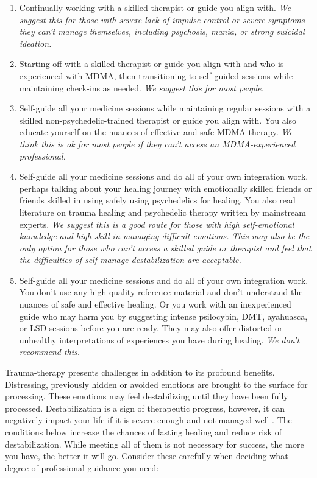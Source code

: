 \documentclass[12pt,letterpaper]{article}
\begin{document}
\begin{enumerate}
    \item Continually working with a skilled therapist or guide you align with. \textit{We suggest this for those with severe lack of impulse control or severe symptoms they can't manage themselves, including psychosis, mania, or strong suicidal ideation.}
    \item Starting off with a skilled therapist or guide you align with and who is experienced with MDMA, then transitioning to self-guided sessions while maintaining check-ins as needed. \textit{We suggest this for most people.}
    \item Self-guide all your medicine sessions while maintaining regular sessions with a skilled non-psychedelic-trained therapist or guide you align with. You also educate yourself on the nuances of effective and safe MDMA therapy. \textit{We think this is ok for most people if they can't access an MDMA-experienced professional.}
    \item Self-guide all your medicine sessions and do all of your own integration work, perhaps talking about your healing journey with emotionally skilled friends or friends skilled in using safely using psychedelics for healing. You also read literature on trauma healing and psychedelic therapy written by mainstream experts. \textit{We suggest this is a good route for those with high self-emotional knowledge and high skill in managing difficult emotions. This may also be the only option for those who can't access a skilled guide or therapist and feel that the difficulties of self-manage destabilization are acceptable.} 
    \item Self-guide all your medicine sessions and do all of your own integration work. You don't use any high quality reference material and don't understand the nuances of safe and effective healing. Or you work with an inexperienced guide who may harm you by suggesting intense psilocybin, DMT, ayahuasca, or LSD sessions before you are ready. They may also offer distorted or unhealthy interpretations of experiences you have during healing. \textit{We don't recommend this.} 
\end{enumerate}
Trauma-therapy presents challenges in addition to its profound benefits. Distressing, previously hidden or avoided emotions are brought to the surface for processing. These emotions may feel destabilizing until they have been fully processed. Destabilization is a sign of therapeutic progress, however, it can negatively impact your life if it is severe enough and not managed well \cite{olthofDestabilization}. The conditions below increase the chances of lasting healing and reduce risk of destabilization. While meeting all of them is not necessary for success, the more you have, the better it will go. Consider these carefully when deciding what degree of professional guidance you need:  
\end{document}
